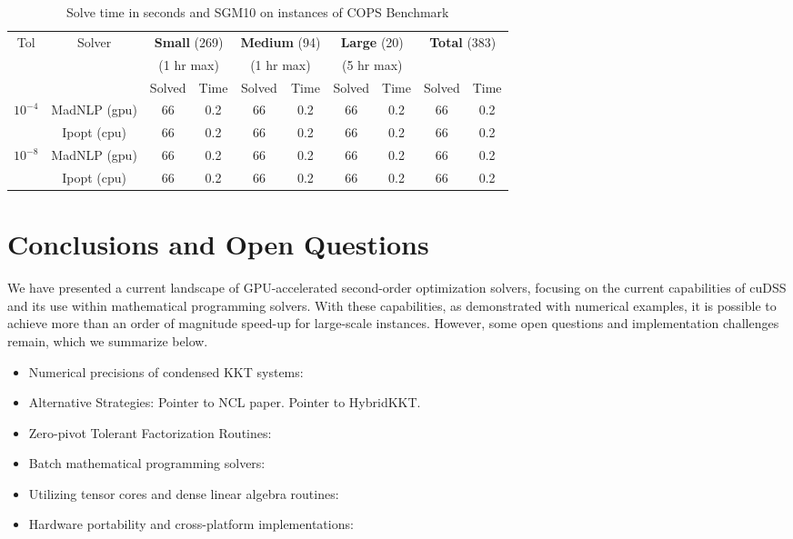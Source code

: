 \documentclass{article}
\begin{document}
\begin{table}[t]
  \centering\small
  \caption{Solve time in seconds and SGM10 on instances of COPS Benchmark}\label{tab:cops}
  \begin{tabular}{|c|c|cc|cc|cc|cc|}
    \hline
    \multirow{ 3}{*}{Tol} & \multirow{ 3}{*}{Solver} & \multicolumn{2}{c|}{\textbf{Small} (269)}& \multicolumn{2}{c|}{\textbf{Medium} (94)}& \multicolumn{2}{c|}{\textbf{Large} (20)}& \multicolumn{2}{c|}{\multirow{2}{*}{\textbf{Total} (383)}}\\
                          && \multicolumn{2}{c|}{(1 hr max)}& \multicolumn{2}{c|}{(1 hr max)}& \multicolumn{2}{c|}{(5 hr max)}&&\\
                          &&  Solved & Time &  Solved & Time &  Solved & Time &  Solved & Time \\
    \hline
    \multirow{2}{*}{$10^{-4}$} & MadNLP (gpu) & 66 & 0.2 & 66 & 0.2 & 66 & 0.2 & 66 & 0.2  \\
                          & Ipopt (cpu) & 66 & 0.2 & 66 & 0.2 & 66 & 0.2 & 66 & 0.2 \\
    \hline
    \multirow{2}{*}{$10^{-8}$} & MadNLP (gpu) & 66 & 0.2 & 66 & 0.2 & 66 & 0.2& 66 & 0.2 \\
                          & Ipopt (cpu) & 66 & 0.2 & 66 & 0.2 & 66 & 0.2& 66 & 0.2 \\
    \hline
  \end{tabular}  
\end{table}


\section{Conclusions and Open Questions}
We have presented a current landscape of GPU-accelerated second-order optimization solvers, focusing on the current capabilities of cuDSS and its use within mathematical programming solvers. With these capabilities, as demonstrated with numerical examples, it is possible to achieve more than an order of magnitude speed-up for large-scale instances. However, some open questions and implementation challenges remain, which we summarize below.
\begin{itemize}[leftmargin=*,itemsep=0pt,parsep=0pt,partopsep=0pt]
\item {Numerical precisions of condensed KKT systems}:
\item {Alternative Strategies}:
Pointer to NCL paper.
Pointer to HybridKKT.
\item {Zero-pivot Tolerant Factorization Routines}: 
\item {Batch mathematical programming solvers}:
\item {Utilizing tensor cores and dense linear algebra routines}:
\item {Hardware portability and cross-platform implementations}:
\end{itemize}
\end{document}
